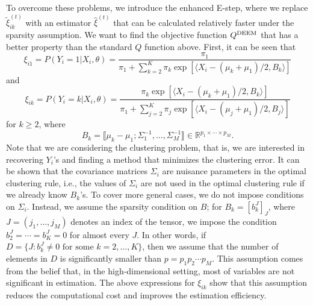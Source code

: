 \documentclass[11pt]{article}
\newcommand{\rp}{\mathbb{R}^{p_1\times \cdots \times p_M}}
\newcommand{\br}[1]{\llbracket #1 \rrbracket}
\newcommand{\wh}{\widehat}
\newcommand{\wt}{\widetilde}
\begin{document}
To overcome these problems, we introduce the enhanced E-step, where we replace $\wt\xi^{(t)}_{ik}$ with an estimator $\wh\xi^{(t)}$ that can be calculated relatively faster under the sparsity assumption. 
We want to find the objective function $Q^{\textup{DEEM}}$ that has a better property than the standard $Q$ function above. First, it can be seen that
\begin{equation}\label{xi1}
  \xi_{i1}=P(Y_i=1|X_i, \theta) = \frac{\pi_1}{\pi_1 + \sum_{k=2}^K \pi_k \exp\left[ \langle X_i - (\mu_k+\mu_1)/2 , B_k \rangle \right]}
\end{equation}
and
\begin{equation}\label{xi2}
  \xi_{ik}=P(Y_i=k|X_i, \theta) = \frac{\pi_k \exp \left[ \langle X_i - (\mu_k+\mu_1)/2 , B_k \rangle \right]}{\pi_1 + \sum_{j=2}^K \pi_j \exp\left[ \langle X_i - (\mu_j+\mu_1)/2 , B_j \rangle \right]}
\end{equation}
for $k\ge2$, where
\begin{equation*}
  B_k = \br{\mu_k - \mu_1 ; \Sigma_1^{-1} , \dots , \Sigma_M^{-1}}\in  \rp.
\end{equation*}
Note that we are considering the clustering problem, that is, we are interested in recovering $Y_i$'s and finding a method that minimizes the clustering error.
It can be shown that the covariance matrices $\Sigma_i$ are nuisance parameters in the optimal clustering rule, i.e., 
the values of $\Sigma_i$ are not used in the optimal clustering rule if we already know $B_k$'s.
To cover more general cases, we do not impose conditions on $\Sigma_i$.
Instead, we assume the sparsity condition on $B$; for $B_k=[b^J_k]_{J}$, where $J=(j_1,\dots, j_M)$ denotes an index of the tensor, we impose the condition $b_2^J=\cdots = b_K^J=0 $ for almost every $J$. In other words, if 
$D= \{J : b_k^J \neq 0 \text{ for some $k=2,\dots, K$} \}$, then we assume that the number of elements in $D$ is significantly smaller than $p=p_1p_2 \cdots p_M$. This assumption comes from the belief that, in the high-dimensional setting, most of variables are not significant in estimation.
The above expressions for $\xi_{ik}$ show that this assumption reduces the computational cost and improves the  estimation efficiency.
\end{document}
